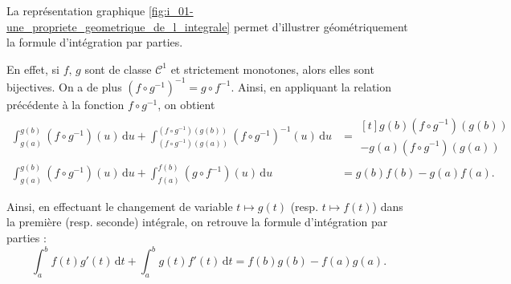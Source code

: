 \begin{remarque}
La représentation graphique \ref{fig:i_01-une_propriete_geometrique_de_l_integrale} permet d'illustrer géométriquement la formule d'intégration par parties.

En effet, si $f,\, g$ sont de classe $\mathcal{C}^1$ et strictement monotones, alors elles sont bijectives. On a de plus \mbox{$(f \circ g^{-1})^{-1} = g \circ f^{-1}$}. Ainsi, en appliquant la relation précédente à la fonction $f \circ g^{-1}$, on obtient
\begin{align*}
\int_{g(a)}^{g(b)} (f \circ g^{-1})(u) \,\mathrm{d}u + \int_{(f\circ g^{-1})(g(a))}^{(f\circ g^{-1})(g(b))} (f \circ g^{-1})^{-1}(u) \,\mathrm{d}u &= \begin{multlined}[t] 
g(b) (f \circ g^{-1})(g(b)) \\
- g(a) (f \circ g^{-1})(g(a))
\end{multlined} \\
\int_{g(a)}^{g(b)} (f \circ g^{-1})(u) \,\mathrm{d}u + \int_{f(a)}^{f(b)} (g \circ f^{-1})(u) \,\mathrm{d}u
&= g(b) f(b) - g(a) f(a).
\end{align*}

Ainsi, en effectuant le changement de variable $t \mapsto g(t)$ (resp. $t \mapsto f(t)$) dans la première (resp. seconde) intégrale, on retrouve la formule d'intégration par parties :
\[
\int_a^b f(t) g'(t) \,\mathrm{d}t + \int_a^b g(t) f'(t) \,\mathrm{d}t = f(b) g(b) - f(a) g(a).
\]
\end{remarque}

